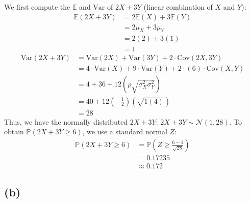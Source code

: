 \documentclass[12pt]{article}
\begin{document}
We first compute the $ \mathbb{E}$ and $\text{Var}$ of $2X + 3Y$ (linear combination of $X$ and $Y$): \begin{align*}
    \mathbb{E}(2X + 3Y) &= 2 \mathbb{E}(X) + 3 \mathbb{E}(Y) \\
    &= 2\mu_X + 3\mu_Y \\ 
    &= 2(2) + 3(1) \\ 
    &= 1
\end{align*} \begin{align*}
    \text{Var}(2X+3Y) &= \text{Var}(2X) + \text{Var}(3Y) + 2 \cdot \text{Cov}(2X, 3Y) \\ 
    &= 4 \cdot \text{Var}(X) + 9 \cdot \text{Var}(Y) + 2 \cdot (6) \cdot \text{Cov} (X,Y) \\ 
    &= 4 + 36 + 12\left(\rho \sqrt{\sigma_X^{2}\sigma_Y^{2}}\right) \\ 
    &= 40 + 12(-\frac{1}{2})\left( \sqrt{1(4)} \right) \\ 
    &= 28
\end{align*} Thus, we have the normally distributed $2X + 3Y$: $2X + 3Y \sim \mathcal{N}(1,28)$. To obtain $ \mathbb{P}(2X + 3Y \geq 6)$, we use a standard normal $Z$: \begin{align*}
    \mathbb{P}(2X + 3Y \geq 6) &= \mathbb{P}\left(Z \geq \frac{6-1}{\sqrt{28}}\right) \\ 
    &= 0.17235 \\ 
    &\boxed{\approx 0.172}
\end{align*}

\subsection*{(b)}
\end{document}
